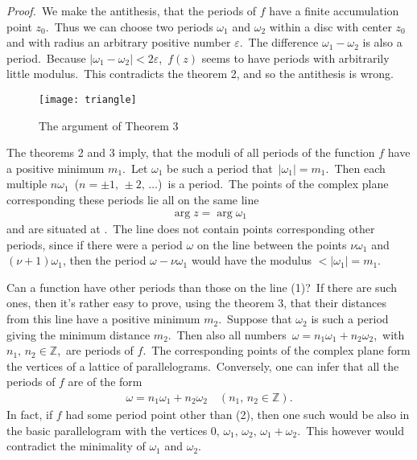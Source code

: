 \documentclass[12pt]{article}
\theoremstyle{definition}
\begin{document}
{\em Proof.}\, We make the antithesis, that the periods of $f$ have a finite accumulation point $z_0$.\, Thus we can choose two periods $\omega_1$ and $\omega_2$ within a disc with center $z_0$ and with radius an arbitrary positive number $\varepsilon$.\, The difference $\omega_1\!-\!\omega_2$ is also a period.\, Because $|\omega_1\!-\!\omega_2| < 2\varepsilon$,\, $f(z)$ seems to have periods with arbitrarily little modulus.\, This contradicts the theorem 2, and so the antithesis is wrong.\\

\begin{figure}
\begin{center}
\texttt{[image: triangle]}
\end{center}
\caption{The argument of Theorem 3}
\end{figure}


The theorems 2 and 3 imply, that the moduli of all periods of the function $f$ have a positive minimum $m_1$.\, Let $\omega_1$ be such a period that\, 
$|\omega_1| = m_1$.\, Then each multiple $n\omega_1$\, 
($n = \pm1,\,\pm2,\,\ldots$)\, is a period.\, The points of the complex plane corresponding these periods lie all on the same line
\begin{align}
   \arg{z} = \arg{\omega_1}
\end{align}
and are situated at .\, The line does not contain points corresponding other periods, since if there were a period $\omega$ on the line between the points $\nu\omega_1$ and $(\nu\!+\!1)\omega_1$, then the period 
$\omega\!-\!\nu\omega_1$ would have the modulus $< |\omega_1| = m_1$.

Can a function have other periods than those on the line (1)?\, If there are such ones, then it's rather easy to prove, using the theorem 3, that their distances from this line have a positive minimum $m_2$.\, Suppose that $\omega_2$ is such a period giving the minimum distance $m_2$.\, Then also all numbers\, $\omega = n_1\omega_1+n_2\omega_2$,\, with\, 
$n_1,\,n_2\in\mathbb{Z}$,\, are periods of $f$.\, The corresponding points of the complex plane form the vertices of a lattice of  parallelograms.\, Conversely, one can infer that all the periods of $f$ are of the form
\begin{align}
\omega = n_1\omega_1\!+\!n_2\omega_2\quad (n_1,\,n_2\in\mathbb{Z}).
\end{align}
In fact, if $f$ had some period point other than (2), then one such would be also in the basic parallelogram with the vertices 
$0,\,\omega_1,\,\omega_2,\,\omega_1\!+\!\omega_2$.\, This however would contradict the minimality of $\omega_1$ and $\omega_2$.
\end{document}
